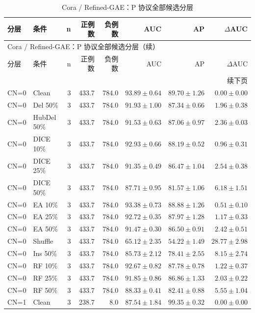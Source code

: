 {\footnotesize
\setlength{\tabcolsep}{3.2pt}
\renewcommand{\arraystretch}{1.10}
\begin{longtable}{llrrrrrr}
\caption{Cora / Refined-GAE：P 协议全部候选分层}\\
\toprule
分层 & 条件 & n & 正例数 & 负例数 & AUC & AP & $\Delta$AUC \\
\midrule
\endfirsthead
\multicolumn{8}{l}{Cora / Refined-GAE：P 协议全部候选分层（续）}\\
\toprule
分层 & 条件 & n & 正例数 & 负例数 & AUC & AP & $\Delta$AUC \\
\midrule
\endhead
\midrule\multicolumn{8}{r}{续下页}\\
\endfoot
\bottomrule
\endlastfoot
CN=0 & Clean & 3 & 433.7 & 784.0 & $93.89\pm0.64$ & $89.70\pm1.26$ & $0.00\pm0.00$ \\
CN=0 & Del 50\% & 3 & 433.7 & 784.0 & $91.93\pm1.00$ & $87.34\pm0.66$ & $1.96\pm0.38$ \\
CN=0 & HubDel 50\% & 3 & 433.7 & 784.0 & $91.53\pm0.63$ & $87.06\pm0.97$ & $2.36\pm0.03$ \\
CN=0 & DICE 10\% & 3 & 433.7 & 784.0 & $92.93\pm0.66$ & $88.19\pm0.52$ & $0.96\pm0.31$ \\
CN=0 & DICE 25\% & 3 & 433.7 & 784.0 & $91.35\pm0.49$ & $86.47\pm1.04$ & $2.54\pm0.38$ \\
CN=0 & DICE 50\% & 3 & 433.7 & 784.0 & $87.71\pm0.95$ & $81.57\pm1.06$ & $6.18\pm1.51$ \\
CN=0 & EA 10\% & 3 & 433.7 & 784.0 & $93.38\pm0.73$ & $88.88\pm1.26$ & $0.51\pm0.10$ \\
CN=0 & EA 25\% & 3 & 433.7 & 784.0 & $92.72\pm0.35$ & $87.97\pm1.28$ & $1.17\pm0.33$ \\
CN=0 & EA 50\% & 3 & 433.7 & 784.0 & $91.47\pm0.30$ & $86.50\pm0.91$ & $2.42\pm0.51$ \\
CN=0 & Shuffle & 3 & 433.7 & 784.0 & $65.12\pm2.35$ & $54.22\pm1.49$ & $28.77\pm2.98$ \\
CN=0 & Ins 50\% & 3 & 433.7 & 784.0 & $85.73\pm2.12$ & $78.41\pm2.55$ & $8.15\pm2.74$ \\
CN=0 & RF 10\% & 3 & 433.7 & 784.0 & $92.67\pm0.82$ & $87.78\pm0.78$ & $1.22\pm0.37$ \\
CN=0 & RF 25\% & 3 & 433.7 & 784.0 & $91.85\pm0.86$ & $86.86\pm1.33$ & $2.03\pm0.22$ \\
CN=0 & RF 50\% & 3 & 433.7 & 784.0 & $88.33\pm0.41$ & $82.41\pm0.88$ & $5.55\pm1.04$ \\
CN=1 & Clean & 3 & 238.7 & 8.0 & $87.54\pm1.84$ & $99.35\pm0.32$ & $0.00\pm0.00$ \\

\end{longtable}}
